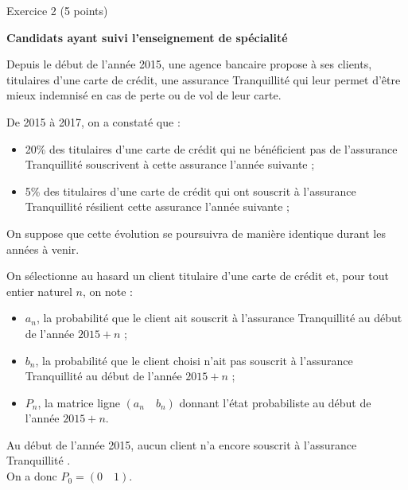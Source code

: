
%
\begin{h2}Exercice 2 (5 points)\end{h2}
\par
\textbf{Candidats ayant suivi l'enseignement de spécialité}
\par
Depuis le début de l'année 2015, une agence bancaire propose à ses clients, titulaires d'une carte de crédit, une assurance \og Tranquillité \fg{} qui leur permet d'être mieux indemnisé en cas de perte ou de vol de leur carte.
\par
De 2015 à 2017, on a constaté que :
\par
\begin{itemize}
     \item
     20\% des titulaires d'une carte de crédit qui ne bénéficient pas de l'assurance \og Tranquillité \fg{} souscrivent à cette assurance l'année suivante ;
     \item
     5\% des titulaires d'une carte de crédit qui ont souscrit à l'assurance \og Tranquillité \fg{} résilient cette assurance l'année suivante  ;
\end{itemize}
\par
On suppose que cette évolution se poursuivra de manière identique durant les années à venir.
\par
On sélectionne au hasard un client titulaire d'une carte de crédit et, pour tout entier naturel $n$, on note :
\par
\begin{itemize}
     \item
     $a_{n}$, la probabilité que le client ait souscrit à l'assurance \og Tranquillité \fg{} au début de l'année $2015 + n$ ;
     \item
     $b_{n}$, la probabilité que le client choisi n'ait pas souscrit à l'assurance \og Tranquillité \fg{} au début de l'année $2015 + n$ ;
     \item
     $P_{n}$, la matrice ligne $\left(a_{n} \quad b_{n}\right)$ donnant l'état probabiliste au début de l'année $2015 + n$.
\end{itemize}
\par
Au début de l'année 2015, aucun client n'a encore souscrit à l'assurance \og Tranquillité \fg{}. \\
On a donc $P_0=\left(0 \quad 1\right)$.
\par
